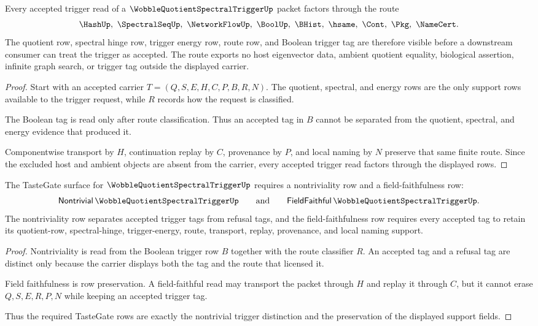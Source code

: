 \begin{theorem}
\label{thm:wobble-quotient-spectral-trigger-spectral-handoff}
Every accepted trigger read of a $\WobbleQuotientSpectralTriggerUp$ packet factors through the route
$$
\HashUp,\ \SpectralSeqUp,\ \NetworkFlowUp,\ \BoolUp,\ \BHist,\ \hsame,\ \Cont,\ \Pkg,\ \NameCert .
$$
The quotient row, spectral hinge row, trigger energy row, route row, and Boolean trigger tag are therefore visible before a downstream consumer can treat the trigger as accepted. The route exports no host eigenvector data, ambient quotient equality, biological assertion, infinite graph search, or trigger tag outside the displayed carrier.
\end{theorem}
\begin{proof}
Start with an accepted carrier $T=(Q,S,E,H,C,P,B,R,N)$. The quotient, spectral, and energy rows are the only support rows available to the trigger request, while $R$ records how the request is classified.

The Boolean tag is read only after route classification. Thus an accepted tag in $B$ cannot be separated from the quotient, spectral, and energy evidence that produced it.

Componentwise transport by $H$, continuation replay by $C$, provenance by $P$, and local naming by $N$ preserve that same finite route. Since the excluded host and ambient objects are absent from the carrier, every accepted trigger read factors through the displayed rows.
\end{proof}

\begin{theorem}
\label{thm:wobble-quotient-spectral-trigger-tastegate-obligations}
The TasteGate surface for $\WobbleQuotientSpectralTriggerUp$ requires a nontriviality row and a field-faithfulness row:
$$
\mathsf{Nontrivial}\,\WobbleQuotientSpectralTriggerUp
\qquad\hbox{and}\qquad
\mathsf{FieldFaithful}\,\WobbleQuotientSpectralTriggerUp .
$$
The nontriviality row separates accepted trigger tags from refusal tags, and the field-faithfulness row requires every accepted tag to retain its quotient-row, spectral-hinge, trigger-energy, route, transport, replay, provenance, and local naming support.
\end{theorem}
\begin{proof}
Nontriviality is read from the Boolean trigger row $B$ together with the route classifier $R$. An accepted tag and a refusal tag are distinct only because the carrier displays both the tag and the route that licensed it.

Field faithfulness is row preservation. A field-faithful read may transport the packet through $H$ and replay it through $C$, but it cannot erase $Q,S,E,R,P,N$ while keeping an accepted trigger tag.

Thus the required TasteGate rows are exactly the nontrivial trigger distinction and the preservation of the displayed support fields.
\end{proof}

